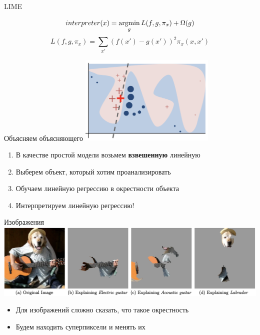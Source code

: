 \documentclass[fleqn, xcolor=x11names]{beamer}
\newcommand{\argmin}{\mathop{\rm argmin}\limits}
\begin{document}
\begin{frame}{LIME}

    $$interpreter(x) = \argmin_{g}L(f,g,\pi_x) + \Omega (g)$$
    $$L(f,g,\pi_x) = \sum\limits_{x'} (f(x') - g(x'))^2\pi_x(x,x')$$

\end{frame}


\begin{frame}{Объясняем объясняющего}
    \centering
    \includegraphics[width=6.5cm]{lime_from_article.png}
    \begin{enumerate}
        \item В качестве простой модели возьмем \textbf{взвешенную} линейную
        \item Выберем объект, который хотим проанализировать
        \item Обучаем линейную регрессию в окрестности объекта
        \item Интерпретируем линейную регрессию!
    \end{enumerate}
\end{frame}

\begin{frame}{Изображения}
    \centering
    \includegraphics[width=1\linewidth]{good_boy_with_guitar.png}
    \begin{itemize}
        \item Для изображений сложно сказать, что такое окрестность
        \item Будем находить суперпиксели и менять их
    \end{itemize}
\end{frame}
\end{document}
